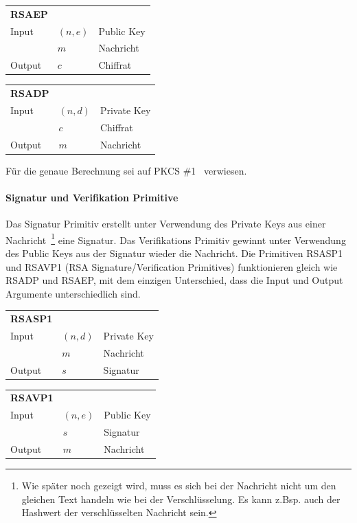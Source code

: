 \documentclass[10pt,a4paper]{article}
\begin{document}
\begin{table}[ht]
    \begin{tabular}{lll}
        \textbf{RSAEP} & & \\
        Input & $(n, e)$ & Public Key \\
              & $m$ & Nachricht \\
        Output & $c$ & Chiffrat
    \end{tabular}
\end{table}

\begin{table}[ht]
    \begin{tabular}{lll}
        \textbf{RSADP} & & \\
        Input & $(n, d)$ & Private Key \\
         & $c$ & Chiffrat \\
        Output & $m$ & Nachricht
    \end{tabular}
\end{table}

Für die genaue Berechnung sei auf PKCS \#1~\cite[Kapitel 5.1]{pkcs1} verwiesen.

\paragraph{Signatur und Verifikation Primitive}
Das Signatur Primitiv erstellt unter Verwendung des Private Keys aus einer
Nachricht~\footnote{Wie später noch gezeigt wird, muss es sich bei der Nachricht nicht um
den gleichen Text handeln wie bei der Verschlüsselung. Es kann z.Bsp. auch der Hashwert
der verschlüsselten Nachricht sein.} eine Signatur. Das Verifikations Primitiv gewinnt
unter Verwendung des Public Keys aus der Signatur wieder die Nachricht. Die Primitiven
RSASP1 und RSAVP1 (RSA Signature/Verification Primitives) funktionieren gleich wie RSADP
und RSAEP, mit dem einzigen Unterschied, dass die Input und Output Argumente
unterschiedlich sind.

\begin{table}
    \begin{tabular}{lll}
        \textbf{RSASP1} & & \\
        Input & $(n, d)$ & Private Key \\
         & $m$ & Nachricht \\
        Output & $s$ & Signatur
    \end{tabular}
\end{table}

\begin{table}
    \begin{tabular}{lll}
        \textbf{RSAVP1} & & \\
        Input & $(n, e)$ & Public Key \\
         & $s$ & Signatur \\
        Output & $m$ & Nachricht
    \end{tabular}
\end{table}
\end{document}
